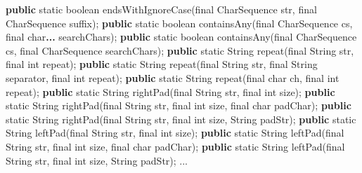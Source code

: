 \documentclass[
]{book}
\newenvironment{Shaded}{\begin{snugshade}}{\end{snugshade}}
\newcommand{\BuiltInTok}[1]{#1}
\newcommand{\DataTypeTok}[1]{\textcolor[rgb]{0.13,0.29,0.53}{#1}}
\newcommand{\FunctionTok}[1]{\textcolor[rgb]{0.00,0.00,0.00}{#1}}
\newcommand{\KeywordTok}[1]{\textcolor[rgb]{0.13,0.29,0.53}{\textbf{#1}}}
\newcommand{\NormalTok}[1]{#1}
\begin{document}
\begin{Shaded}
\begin{Highlighting}[]
\KeywordTok{public} \DataTypeTok{static} \DataTypeTok{boolean} \FunctionTok{endsWithIgnoreCase}\NormalTok{(}\DataTypeTok{final} \BuiltInTok{CharSequence}\NormalTok{ str, }\DataTypeTok{final} \BuiltInTok{CharSequence}\NormalTok{ suffix);}
\KeywordTok{public} \DataTypeTok{static} \DataTypeTok{boolean} \FunctionTok{containsAny}\NormalTok{(}\DataTypeTok{final} \BuiltInTok{CharSequence}\NormalTok{ cs, }\DataTypeTok{final} \DataTypeTok{char}\KeywordTok{... }\NormalTok{searchChars);}
\KeywordTok{public} \DataTypeTok{static} \DataTypeTok{boolean} \FunctionTok{containsAny}\NormalTok{(}\DataTypeTok{final} \BuiltInTok{CharSequence}\NormalTok{ cs, }\DataTypeTok{final} \BuiltInTok{CharSequence}\NormalTok{ searchChars);}
\KeywordTok{public} \DataTypeTok{static} \BuiltInTok{String} \FunctionTok{repeat}\NormalTok{(}\DataTypeTok{final} \BuiltInTok{String}\NormalTok{ str, }\DataTypeTok{final} \DataTypeTok{int}\NormalTok{ repeat);}
\KeywordTok{public} \DataTypeTok{static} \BuiltInTok{String} \FunctionTok{repeat}\NormalTok{(}\DataTypeTok{final} \BuiltInTok{String}\NormalTok{ str, }\DataTypeTok{final} \BuiltInTok{String}\NormalTok{ separator, }\DataTypeTok{final} \DataTypeTok{int}\NormalTok{ repeat);}
\KeywordTok{public} \DataTypeTok{static} \BuiltInTok{String} \FunctionTok{repeat}\NormalTok{(}\DataTypeTok{final} \DataTypeTok{char}\NormalTok{ ch, }\DataTypeTok{final} \DataTypeTok{int}\NormalTok{ repeat);}
\KeywordTok{public} \DataTypeTok{static} \BuiltInTok{String} \FunctionTok{rightPad}\NormalTok{(}\DataTypeTok{final} \BuiltInTok{String}\NormalTok{ str, }\DataTypeTok{final} \DataTypeTok{int}\NormalTok{ size);}
\KeywordTok{public} \DataTypeTok{static} \BuiltInTok{String} \FunctionTok{rightPad}\NormalTok{(}\DataTypeTok{final} \BuiltInTok{String}\NormalTok{ str, }\DataTypeTok{final} \DataTypeTok{int}\NormalTok{ size, }\DataTypeTok{final} \DataTypeTok{char}\NormalTok{ padChar);}
\KeywordTok{public} \DataTypeTok{static} \BuiltInTok{String} \FunctionTok{rightPad}\NormalTok{(}\DataTypeTok{final} \BuiltInTok{String}\NormalTok{ str, }\DataTypeTok{final} \DataTypeTok{int}\NormalTok{ size, }\BuiltInTok{String}\NormalTok{ padStr);}
\KeywordTok{public} \DataTypeTok{static} \BuiltInTok{String} \FunctionTok{leftPad}\NormalTok{(}\DataTypeTok{final} \BuiltInTok{String}\NormalTok{ str, }\DataTypeTok{final} \DataTypeTok{int}\NormalTok{ size);}
\KeywordTok{public} \DataTypeTok{static} \BuiltInTok{String} \FunctionTok{leftPad}\NormalTok{(}\DataTypeTok{final} \BuiltInTok{String}\NormalTok{ str, }\DataTypeTok{final} \DataTypeTok{int}\NormalTok{ size, }\DataTypeTok{final} \DataTypeTok{char}\NormalTok{ padChar);}
\KeywordTok{public} \DataTypeTok{static} \BuiltInTok{String} \FunctionTok{leftPad}\NormalTok{(}\DataTypeTok{final} \BuiltInTok{String}\NormalTok{ str, }\DataTypeTok{final} \DataTypeTok{int}\NormalTok{ size, }\BuiltInTok{String}\NormalTok{ padStr);}
\NormalTok{ ...}
\end{Highlighting}
\end{Shaded}
\end{document}
